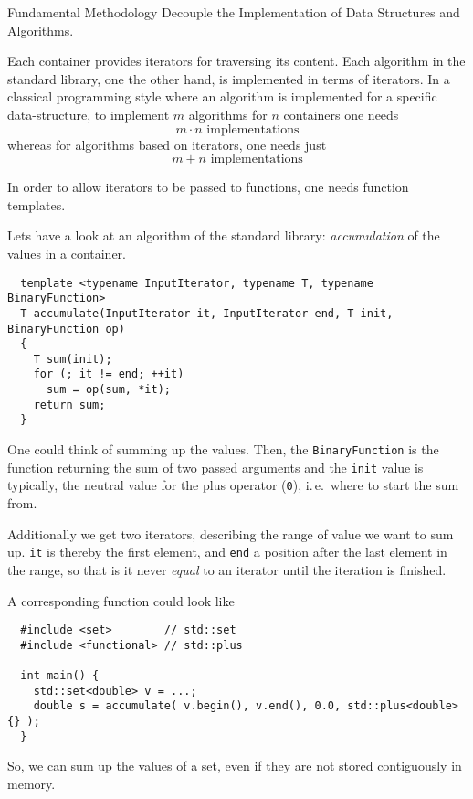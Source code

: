 \begin{guideline}{Fundamental Methodology}
  Decouple the Implementation of Data Structures and Algorithms.
\end{guideline}

Each container provides iterators for traversing its content. Each algorithm in the standard library, one the other hand, is implemented in terms
of iterators. In a classical programming style where an algorithm is implemented for a specific data-structure, to implement $m$ algorithms for
$n$ containers one needs
\[
  m\cdot n\text{ implementations}
\]
whereas for algorithms based on iterators, one needs just
\[
  m+n\text{ implementations}
\]

In order to allow iterators to be passed to functions, one needs function templates.

\begin{example}
  Lets have a look at an algorithm of the standard library: \emph{accumulation} of the values in a container.
  \begin{verbatim}
  template <typename InputIterator, typename T, typename BinaryFunction>
  T accumulate(InputIterator it, InputIterator end, T init, BinaryFunction op)
  {
    T sum(init);
    for (; it != end; ++it)
      sum = op(sum, *it);
    return sum;
  }
  \end{verbatim}

  One could think of summing up the values. Then, the \texttt{BinaryFunction} is the function returning
  the sum of two passed arguments and the \texttt{init} value is typically, the neutral value for the plus
  operator (\texttt{0}), i.\,e.\ where to start the sum from.

  Additionally we get two iterators, describing the range of value we want to sum up. \texttt{it} is thereby the
  first element, and \texttt{end} a position after the last element in the range, so that is it never \textit{equal}
  to an iterator until the iteration is finished.

  A corresponding  function could look like
  \begin{verbatim}
  #include <set>        // std::set
  #include <functional> // std::plus

  int main() {
    std::set<double> v = ...;
    double s = accumulate( v.begin(), v.end(), 0.0, std::plus<double>{} );
  }
  \end{verbatim}
  So, we can sum up the values of a set, even if they are not stored contiguously in memory.
\end{example}


